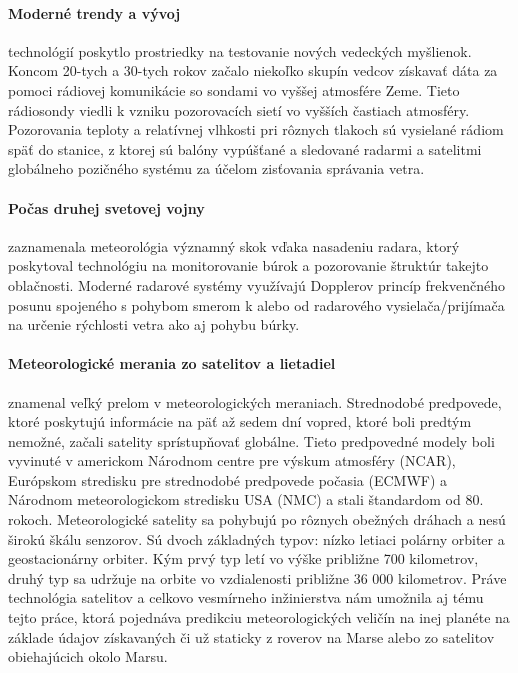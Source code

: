 \paragraph{Moderné trendy a vývoj} technológií poskytlo prostriedky na testovanie nových vedeckých myšlienok. Koncom 20-tych a 30-tych rokov začalo niekoľko skupín vedcov získavať dáta za pomoci rádiovej komunikácie so sondami vo vyššej atmosfére Zeme. Tieto rádiosondy viedli k vzniku pozorovacích sietí vo vyšších častiach atmosféry. Pozorovania teploty a relatívnej vlhkosti pri rôznych tlakoch sú vysielané rádiom späť do stanice, z ktorej sú balóny vypúšťané a sledované radarmi a satelitmi globálneho pozičného systému za účelom zisťovania správania vetra.

\paragraph{Počas druhej svetovej vojny} zaznamenala meteorológia významný skok vďaka nasadeniu radara, ktorý poskytoval technológiu na monitorovanie búrok a pozorovanie štruktúr takejto oblačnosti. Moderné radarové systémy využívajú Dopplerov princíp frekvenčného posunu spojeného s pohybom smerom k alebo od radarového vysielača/prijímača na určenie rýchlosti vetra ako aj pohybu búrky.

\paragraph{Meteorologické merania zo satelitov a lietadiel} znamenal veľký prelom v meteorologických meraniach. Strednodobé predpovede, ktoré poskytujú informácie na päť až sedem dní vopred, ktoré boli predtým nemožné, začali satelity sprístupňovať globálne. Tieto predpovedné modely boli vyvinuté v americkom Národnom centre pre výskum atmosféry (NCAR), Európskom stredisku pre strednodobé predpovede počasia (ECMWF) a Národnom meteorologickom stredisku USA (NMC) a stali štandardom od 80. rokoch. Meteorologické satelity sa pohybujú po rôznych obežných dráhach a nesú širokú škálu senzorov. Sú dvoch základných typov: nízko letiaci polárny orbiter a geostacionárny orbiter. Kým prvý typ letí vo výške približne 700 kilometrov, druhý typ sa udržuje na orbite vo vzdialenosti približne 36 000 kilometrov. Práve technológia satelitov a celkovo vesmírneho inžinierstva nám umožnila aj tému tejto práce, ktorá pojednáva predikciu meteorologických veličín na inej planéte na základe údajov získavaných či už staticky z roverov na Marse alebo zo satelitov obiehajúcich okolo Marsu.





